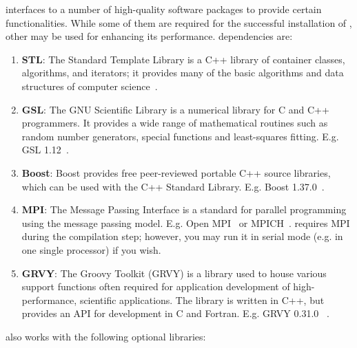 \Queso{} interfaces to a number of high-quality software packages to provide certain functionalities. While some of them are required for the successful installation of \Queso{}, other may be used for enhancing its performance. 
%
\Queso{} dependencies are:
\begin{enumerate}%

  \item \textbf{STL}: The Standard Template Library is a C++ library of container classes, algorithms, and iterators; it provides many of the basic algorithms and data structures of computer science~\cite{STL}. %

  \item \textbf{GSL}: The GNU Scientific Library is a numerical library for C and C++ programmers. It provides a wide range of mathematical routines such as random number generators, special functions and least-squares fitting. E.g. GSL 1.12~\cite{Gsl}. %

  \item \textbf{Boost}: Boost provides free peer-reviewed portable C++ source libraries, which can be used with the C++ Standard Library. E.g. Boost 1.37.0~\cite{Boost}.

  \item \textbf{MPI}: The Message Passing Interface is a standard for parallel programming using the message passing model. E.g. Open MPI~\cite{Openmpi} or MPICH~\cite{Mpich}. \Queso{} requires MPI during the compilation step; however, you may run it in serial mode (e.g. in one single processor) if you wish. 

  \item \textbf{GRVY}: The Groovy Toolkit (GRVY) is a library used to house various support functions often required for application development of high-performance, scientific applications. The library is written in C++, but provides an API for development in C and Fortran. E.g. GRVY 0.31.0 ~\cite{grvy}.

\end{enumerate}%

\Queso{} also works with the following optional libraries:

